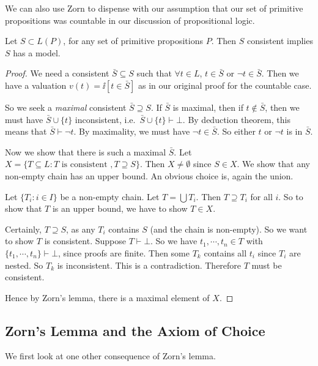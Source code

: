 \documentclass[a4paper, 10pt, twocolumn]{amsart}
\begin{document}
We can also use Zorn to dispense with our assumption that our set of primitive propositions was countable in our discussion of propositional logic.

\begin{theorem}  Let $S \subset L(P)$, for any set of primitive propositions $P$. Then $S$ consistent implies $S$ has a model.
\end{theorem}
\begin{proof}
  
  We need a consistent $\bar S \subseteq S$ such that $\forall t\in L$, $t\in \bar S$ or $\neg t\in \bar S$. Then we have a valuation $v(t) = \ii[t \in \bar S]$ as in our original proof for the countable case.

  So we seek a \emph{maximal} consistent $\bar S\supseteq S$. If $\bar S$ is maximal, then if $t\not\in \bar S$, then we must have $\bar S \cup \{t\}$ inconsistent, i.e.\ $\bar S \cup \{t\}\vdash \bot$. By deduction theorem, this means that $\bar S \vdash \neg t$. By maximality, we must have $\neg t \in \bar S$. So either $t$ or $\neg t$ is in $\bar S$.

  Now we show that there is such a maximal $\bar S$. Let $X = \{ T\subseteq L: T\text{ is consistent }, T\supseteq S\}$. Then $X\not=\emptyset$ since $S\in X$. We show that any non-empty chain has an upper bound. An obvious choice is, again the union.

  Let $\{T_i: i\in I\}$ be a non-empty chain. Let $T = \bigcup T_i$. Then $T\supseteq T_i$ for all $i$. So to show that $T$ is an upper bound, we have to show $T\in X$.

  Certainly, $T\supseteq S$, as any $T_i$ contains $S$ (and the chain is non-empty). So we want to show $T$ is consistent. Suppose $T\vdash \bot$. So we have $t_1, \cdots, t_n \in T$ with $\{t_1, \cdots, t_n\} \vdash \bot$, since proofs are finite. Then some $T_k$ contains all $t_i$ since $T_i$ are nested. So $T_k$ is inconsistent. This is a contradiction. Therefore $T$ must be consistent.

  Hence by Zorn's lemma, there is a maximal element of $X$.
\end{proof}

\subsection{Zorn's Lemma and the Axiom of Choice}

We first look at one other consequence of Zorn's lemma.
\end{document}
